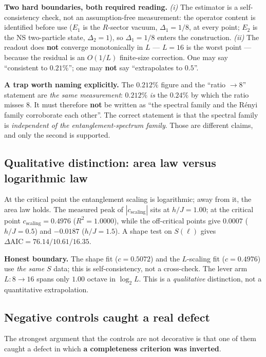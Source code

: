\documentclass[11pt,a4paper]{article}
\begin{document}
\noindent\textbf{Two hard boundaries, both required reading.}
\emph{(i)} The estimator is a self-consistency check, not an assumption-free
measurement: the operator content is identified before use ($E_1$ is the $R$-sector
vacuum, $\Delta_1 = 1/8$, at every point; $E_2$ is the NS two-particle state,
$\Delta_2 = 1$), so $\Delta_1 = 1/8$ enters the construction.
\emph{(ii)} The readout does \textbf{not} converge monotonically in $L$ ---
$L{=}16$ is the worst point --- because the residual is an $O(1/L)$ finite-size
correction. One may say ``consistent to $0.21\%$''; one may \textbf{not} say
``extrapolates to $0.5$''.

\medskip
\noindent\textbf{A trap worth naming explicitly.} The $0.212\%$ figure and the
``ratio $\to 8$'' statement are \emph{the same measurement}: $0.212\%$ \emph{is}
the $0.24\%$ by which the ratio misses 8. It must therefore \textbf{not} be written
as ``the spectral family and the Rényi family corroborate each other''. The correct
statement is that the spectral family is \emph{independent of the
entanglement-spectrum family}. Those are different claims, and only the second is
supported.

\subsection{Qualitative distinction: area law versus logarithmic law}
\label{sec:arealaw}

At the critical point the entanglement scaling is logarithmic; away from it, the
area law holds. The measured peak of $|c_{\text{scaling}}|$ sits at $h/J = 1.00$;
at the critical point $c_{\text{scaling}} = 0.4976$ ($R^2 = 1.0000$), while the
off-critical points give $0.0007$ ($h/J = 0.5$) and $-0.0187$ ($h/J = 1.5$). A
shape test on $S(\ell)$ gives $\Delta\mathrm{AIC} = 76.14 / 10.61 / 16.35$.

\noindent\textbf{Honest boundary.} The shape fit ($c = 0.5072$) and the $L$-scaling
fit ($c = 0.4976$) use \emph{the same} $S$ data; this is self-consistency, not a
cross-check. The lever arm $L: 8 \to 16$ spans only $1.00$ octave in $\log_2 L$.
This is a \emph{qualitative} distinction, not a quantitative extrapolation.

\subsection{Negative controls caught a real defect}
\label{sec:bug}

The strongest argument that the controls are not decorative is that one of them
caught a defect in which \textbf{a completeness criterion was inverted}.
\end{document}
